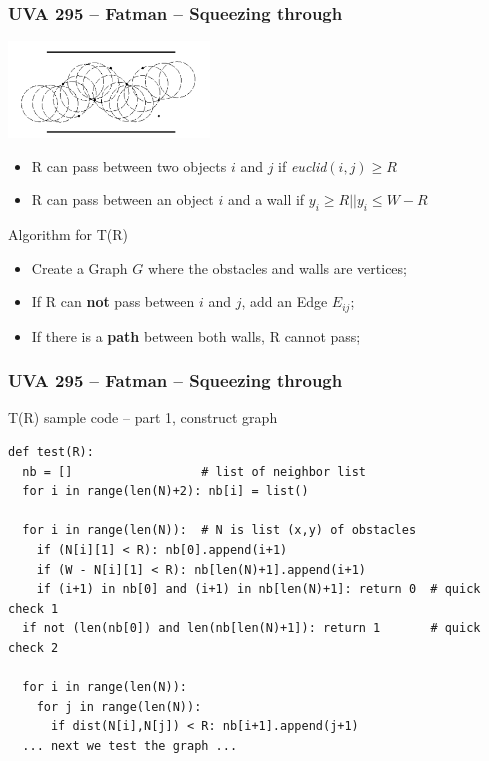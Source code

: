 \begin{frame}
  \frametitle{UVA 295 -- Fatman -- Squeezing through}

    \begin{center}
      \includegraphics[width=0.4\textwidth]{img/fatman}
    \end{center}

    \begin{itemize}
    \item R can pass between two objects $i$ and $j$ if \emph{euclid}$(i,j) \geq R$
    \item R can pass between an object $i$ and a wall if $y_i \geq R || y_i \leq W-R$
    \end{itemize}

    \begin{exampleblock}{Algorithm for T(R)}
      \begin{itemize}
      \item Create a Graph $G$ where the obstacles and walls are vertices;
      \item If R can {\bf not} pass between $i$ and $j$, add an Edge $E_{ij}$;
      \item If there is a {\bf path} between both walls, \alert{R cannot pass};
      \end{itemize}
    \end{exampleblock}
\end{frame}

\begin{frame}[fragile]
  \frametitle{UVA 295 -- Fatman -- Squeezing through}

  {\smaller
  \begin{block}{T(R) sample code -- part 1, construct graph}
\begin{verbatim}
def test(R):
  nb = []                  # list of neighbor list
  for i in range(len(N)+2): nb[i] = list()

  for i in range(len(N)):  # N is list (x,y) of obstacles
    if (N[i][1] < R): nb[0].append(i+1)
    if (W - N[i][1] < R): nb[len(N)+1].append(i+1)
    if (i+1) in nb[0] and (i+1) in nb[len(N)+1]: return 0  # quick check 1
  if not (len(nb[0]) and len(nb[len(N)+1]): return 1       # quick check 2

  for i in range(len(N)):
    for j in range(len(N)):
      if dist(N[i],N[j]) < R: nb[i+1].append(j+1)
  ... next we test the graph ...
\end{verbatim}
  \end{block}
  }
\end{frame}


